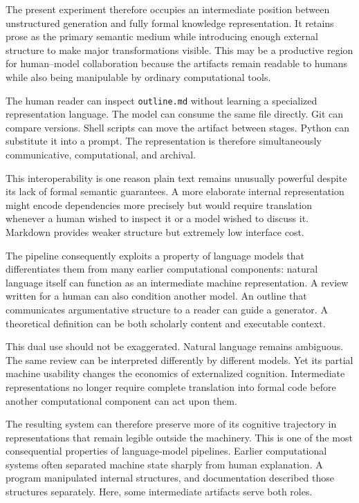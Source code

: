 \documentclass[11pt]{article}
\begin{document}
The present experiment therefore occupies an intermediate position between unstructured generation and fully formal knowledge representation. It retains prose as the primary semantic medium while introducing enough external structure to make major transformations visible. This may be a productive region for human--model collaboration because the artifacts remain readable to humans while also being manipulable by ordinary computational tools.

The human reader can inspect \texttt{outline.md} without learning a specialized representation language. The model can consume the same file directly. Git can compare versions. Shell scripts can move the artifact between stages. Python can substitute it into a prompt. The representation is therefore simultaneously communicative, computational, and archival.

This interoperability is one reason plain text remains unusually powerful despite its lack of formal semantic guarantees. A more elaborate internal representation might encode dependencies more precisely but would require translation whenever a human wished to inspect it or a model wished to discuss it. Markdown provides weaker structure but extremely low interface cost.

The pipeline consequently exploits a property of language models that differentiates them from many earlier computational components: natural language itself can function as an intermediate machine representation. A review written for a human can also condition another model. An outline that communicates argumentative structure to a reader can guide a generator. A theoretical definition can be both scholarly content and executable context.

This dual use should not be exaggerated. Natural language remains ambiguous. The same review can be interpreted differently by different models. Yet its partial machine usability changes the economics of externalized cognition. Intermediate representations no longer require complete translation into formal code before another computational component can act upon them.

The resulting system can therefore preserve more of its cognitive trajectory in representations that remain legible outside the machinery. This is one of the most consequential properties of language-model pipelines. Earlier computational systems often separated machine state sharply from human explanation. A program manipulated internal structures, and documentation described those structures separately. Here, some intermediate artifacts serve both roles.
\end{document}
